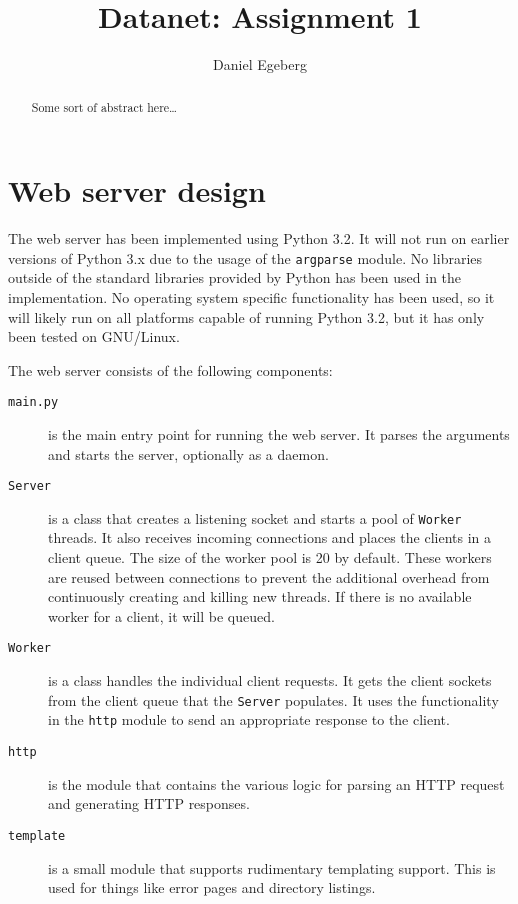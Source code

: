 \documentclass{sig-alternate}
\begin{document}
\title{Datanet: Assignment 1}


\author{
\alignauthor
    Daniel Egeberg\\
}

\maketitle

\begin{abstract}
    Some sort of abstract here\ldots
\end{abstract}

\section{Web server design}

The web server has been implemented using Python 3.2. It will not run on
earlier versions of Python 3.x due to the usage of the \verb+argparse+
module. No libraries outside of the standard libraries provided by Python has
been used in the implementation. No operating system specific functionality
has been used, so it will likely run on all platforms capable of running
Python 3.2, but it has only been tested on GNU/Linux.

The web server consists of the following components:

\begin{description}
    \item[\texttt{main.py}] is the main entry point for running the web
        server. It parses the arguments and starts the server, optionally as a
        daemon.
    \item[\texttt{Server}] is a class that creates a listening socket
        and starts a pool of \texttt{Worker} threads. It also receives
        incoming connections and places the clients in a client queue. The
        size of the worker pool is 20 by default. These workers are reused
        between connections to prevent the additional overhead from
        continuously creating and killing new threads. If there is no
        available worker for a client, it will be queued.
    \item[\texttt{Worker}] is a class handles the individual client requests.
        It gets the client sockets from the client queue that the
        \texttt{Server} populates. It uses the functionality in the
        \texttt{http} module to send an appropriate response to the client.
    \item[\texttt{http}] is the module that contains the various logic for
        parsing an HTTP request and generating HTTP responses.
    \item[\texttt{template}] is a small module that supports rudimentary
        templating support. This is used for things like error pages and
        directory listings.
\end{description}
\end{document}
